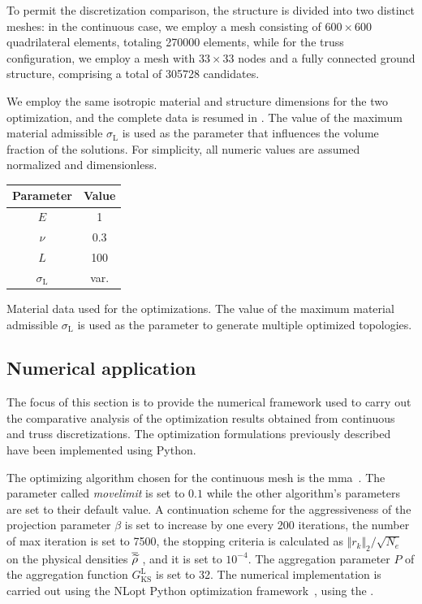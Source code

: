 To permit the discretization comparison, the structure is divided into two distinct meshes: in the continuous case, we employ a mesh consisting of $600\times600$ quadrilateral elements, totaling \num[group-separator={$\,$}]{270000} elements, while for the truss configuration, we employ a mesh with $33\times 33$ nodes and a fully connected ground structure, comprising a total of \num[group-separator={$\,$}]{305728} candidates.

We employ the same isotropic material and structure dimensions for the two optimization, and the complete data is resumed in . The value of the maximum material admissible $\sigma_\text{L}$ is used as the parameter that influences the volume fraction of the solutions. For simplicity, all numeric values are assumed normalized and dimensionless.

\begin{margintable}[]
    \centering
    \begin{tabular}{cc}
    \toprule
    \textbf{Parameter}        & \textbf{Value} \\ \midrule
    $E$              & 1     \\
    $\nu$            & 0.3   \\
    $L$              & 100   \\
    $\sigma_\text{L}$ & var. \\
    \bottomrule
    \end{tabular}
    \caption{Material data used for the optimizations. The value of the maximum material admissible $\sigma_\text{L}$ is used as the parameter to generate multiple optimized topologies.}
    \label{tab:03_mat}
\end{margintable}

\subsection{Numerical application}
The focus of this section is to provide the numerical framework used to carry out the comparative analysis of the optimization results obtained from continuous and truss discretizations. The optimization formulations previously described have been implemented using Python.

The optimizing algorithm chosen for the continuous mesh is the \gls{mma}~. The parameter called \textit{movelimit} is set to $0.1$ while the other algorithm's parameters are set to their default value. A continuation scheme for the aggressiveness of the projection parameter $\beta$ is set to increase by one every 200 iterations, the number of max iteration is set to 7500, the stopping criteria is calculated as $\Vert r_k \Vert_2 / \sqrt{N_e}$ on the physical densities $\overline{\widetilde{\rho}}$ \cite{ferrari_new_2020}, and it is set to $10^{-4}$. The aggregation parameter $P$ of the aggregation function $G_{\text{KS}}^\text{L}$ is set to 32. The numerical implementation is carried out using the NLopt Python optimization framework~, using the .

